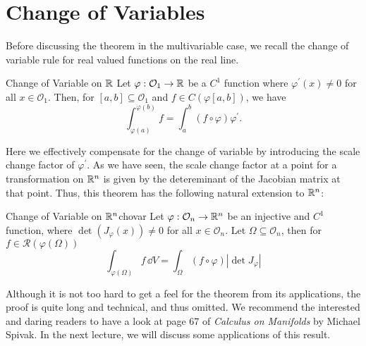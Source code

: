 \documentclass[../Analysis-3.tex]{subfiles}
\begin{document}
\section{Change of Variables}

Before discussing the theorem in the multivariable case, we recall the change of variable rule for real valued functions on the real line.

\begin{Thm}{Change of Variable on $\mathbb{R}$}{}
  Let $\varphi : \mathcal{O}_1 \to \mathbb{R}$ be a $C^1$ function where $\varphi^\prime(x) \neq 0$ for all $x \in \mathcal{O}_1$. Then, for $[a,b] \subseteq \mathcal{O}_1$ and $f \in C(\varphi[a,b])$, we have
  \[
    \int_{\varphi(a)}^{\varphi(b)} f = \int_a^b (f \circ \varphi) \varphi^\prime.
  \]
\end{Thm}

Here we effectively compensate for the change of variable by introducing the scale change factor of $\varphi^\prime$. As we have seen, the scale change factor at a point for a transformation on $\mathbb{R}^n$ is given by the detereminant of the Jacobian matrix at that point. Thus, this theorem has the following natural extension to $\mathbb{R}^n$:\\

\begin{Thm}{Change of Variable on $\mathbb{R}^n$}{chovar}
  Let $\varphi : \mathcal{O}_n \to \mathbb{R}^n$ be an injective and $C^1$ function, where $\det(J_{\varphi}(x)) \neq 0$ for all $x \in \mathcal{O}_n$. Let $\Omega \subseteq \mathcal{O}_n$, then for $f \in \mathscr{R}(\varphi(\Omega))$
  \[
    \int_{\varphi(\Omega)} f \, \dd V = \int_{\Omega} (f \circ \varphi) |\det J_{\varphi}|
  \]
\end{Thm}

Although it is not too hard to get a feel for the theorem from its applications, the proof is quite long and technical, and thus omitted. We recommend the interested and daring readers to have a look at page 67 of \textit{Calculus on Manifolds} by Michael Spivak. In the next lecture, we will discuss some applications of this result.
\end{document}
